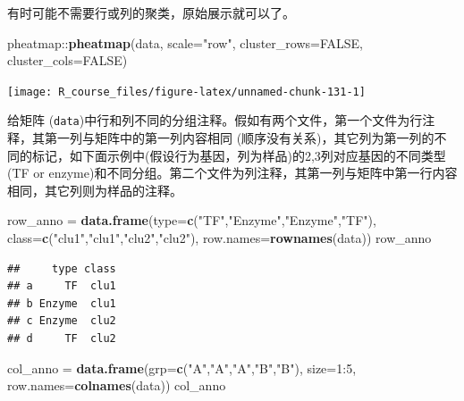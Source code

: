 \documentclass[]{article}
\newenvironment{Shaded}{\begin{snugshade}}{\end{snugshade}}
\newcommand{\KeywordTok}[1]{\textcolor[rgb]{0.13,0.29,0.53}{\textbf{{#1}}}}
\newcommand{\DataTypeTok}[1]{\textcolor[rgb]{0.13,0.29,0.53}{{#1}}}
\newcommand{\DecValTok}[1]{\textcolor[rgb]{0.00,0.00,0.81}{{#1}}}
\newcommand{\StringTok}[1]{\textcolor[rgb]{0.31,0.60,0.02}{{#1}}}
\newcommand{\OtherTok}[1]{\textcolor[rgb]{0.56,0.35,0.01}{{#1}}}
\newcommand{\NormalTok}[1]{{#1}}
\numberwithin{figure}{section}
\numberwithin{table}{section}
\theoremstyle{definition}
\theoremstyle{definition}
\theoremstyle{definition}
\theoremstyle{remark}
\begin{document}
有时可能不需要行或列的聚类，原始展示就可以了。

\begin{Shaded}
\begin{Highlighting}[]
\NormalTok{pheatmap::}\KeywordTok{pheatmap}\NormalTok{(data, }\DataTypeTok{scale=}\StringTok{"row"}\NormalTok{, }\DataTypeTok{cluster_rows=}\OtherTok{FALSE}\NormalTok{, }\DataTypeTok{cluster_cols=}\OtherTok{FALSE}\NormalTok{)}
\end{Highlighting}
\end{Shaded}

\begin{center}\texttt{[image: R\_course\_files/figure-latex/unnamed-chunk-131-1]} \end{center}

给矩阵
(\texttt{data})中行和列不同的分组注释。假如有两个文件，第一个文件为行注释，其第一列与矩阵中的第一列内容相同
(顺序没有关系)，其它列为第一列的不同的标记，如下面示例中(假设行为基因，列为样品)的2,3列对应基因的不同类型
(TF or
enzyme)和不同分组。第二个文件为列注释，其第一列与矩阵中第一行内容相同，其它列则为样品的注释。

\begin{Shaded}
\begin{Highlighting}[]
\NormalTok{row_anno =}\StringTok{ }\KeywordTok{data.frame}\NormalTok{(}\DataTypeTok{type=}\KeywordTok{c}\NormalTok{(}\StringTok{"TF"}\NormalTok{,}\StringTok{"Enzyme"}\NormalTok{,}\StringTok{"Enzyme"}\NormalTok{,}\StringTok{"TF"}\NormalTok{), }
        \DataTypeTok{class=}\KeywordTok{c}\NormalTok{(}\StringTok{"clu1"}\NormalTok{,}\StringTok{"clu1"}\NormalTok{,}\StringTok{"clu2"}\NormalTok{,}\StringTok{"clu2"}\NormalTok{), }\DataTypeTok{row.names=}\KeywordTok{rownames}\NormalTok{(data))}
\NormalTok{row_anno}
\end{Highlighting}
\end{Shaded}

\begin{verbatim}
##     type class
## a     TF  clu1
## b Enzyme  clu1
## c Enzyme  clu2
## d     TF  clu2
\end{verbatim}

\begin{Shaded}
\begin{Highlighting}[]
\NormalTok{col_anno =}\StringTok{ }\KeywordTok{data.frame}\NormalTok{(}\DataTypeTok{grp=}\KeywordTok{c}\NormalTok{(}\StringTok{"A"}\NormalTok{,}\StringTok{"A"}\NormalTok{,}\StringTok{"A"}\NormalTok{,}\StringTok{"B"}\NormalTok{,}\StringTok{"B"}\NormalTok{), }\DataTypeTok{size=}\DecValTok{1}\NormalTok{:}\DecValTok{5}\NormalTok{, }\DataTypeTok{row.names=}\KeywordTok{colnames}\NormalTok{(data))}
\NormalTok{col_anno}
\end{Highlighting}
\end{Shaded}
\end{document}
